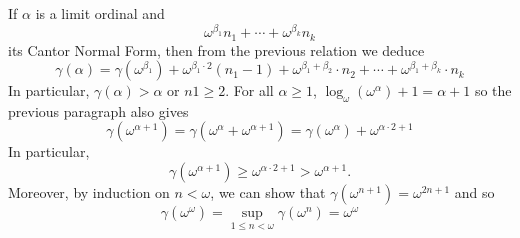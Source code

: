 If \(\alpha\) is a limit ordinal and
\begin{equation*}
\omega^{\beta_1}n_1 + \cdots + \omega^{\beta_{k}}n_k
\end{equation*}
its Cantor Normal Form, then from the previous relation we deduce
\begin{equation*}
\gamma(\alpha)
 = \gamma\left(\omega^{\beta_1}\right)
   + \omega^{\beta_1\cdot 2}
     \left(n_1-1\right)
     + \omega^{\beta_{1}+\beta_{2}}\cdot n_{2} + \cdots
     + \omega^{\beta_{1}+\beta_{k}}\cdot n_{k}
\end{equation*}
In particular, \(\gamma(\alpha) > \alpha\)
or \(n1 \geq 2\). For all \(\alpha \geq 1\),
\(\log_{\omega}(\omega^\alpha)+1 = \alpha + 1\)
so the previous paragraph also gives
\begin{equation*}
\gamma(\omega^{\alpha+1})
 = \gamma\left(\omega^{\alpha} + \omega^{\alpha+1}\right)
 = \gamma(\omega^{\alpha}) + \omega^{\alpha\cdot 2+1}
\end{equation*}
In particular,
\begin{equation*}
\gamma(\omega^{\alpha+1}) \geq \omega^{\alpha\cdot 2 + 1} > \omega^{\alpha+1}.
\end{equation*}
Moreover, by
induction on \(n < \omega\), we can show that
\(\gamma(\omega^{n+1})=\omega^{2n+1}\)
and so
\begin{equation*}
\gamma(\omega^{\omega})
 = \sup_{1\leq n < \omega}\gamma\left({\omega^n}\right)
 = \omega^{\omega}
\end{equation*}

